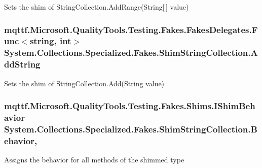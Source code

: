Sets the shim of String\-Collection.\-Add\-Range(\-String\mbox{[}$\,$\mbox{]} value)

\hypertarget{class_system_1_1_collections_1_1_specialized_1_1_fakes_1_1_shim_string_collection_ad96d351cb71a49a83fb719f2323b7cc3}{
\subsubsection[{Add\-String}]{\setlength{\rightskip}{0pt plus 5cm}mqttf.\-Microsoft.\-Quality\-Tools.\-Testing.\-Fakes.\-Fakes\-Delegates.\-Func$<$string, int$>$ System.\-Collections.\-Specialized.\-Fakes.\-Shim\-String\-Collection.\-Add\-String\hspace{0.3cm}{\ttfamily [set]}}}\label{class_system_1_1_collections_1_1_specialized_1_1_fakes_1_1_shim_string_collection_ad96d351cb71a49a83fb719f2323b7cc3}


Sets the shim of String\-Collection.\-Add(\-String value)

\hypertarget{class_system_1_1_collections_1_1_specialized_1_1_fakes_1_1_shim_string_collection_a4e79435f39bae5e9add02a591125acab}{
\subsubsection[{Behavior}]{\setlength{\rightskip}{0pt plus 5cm}mqttf.\-Microsoft.\-Quality\-Tools.\-Testing.\-Fakes.\-Shims.\-I\-Shim\-Behavior System.\-Collections.\-Specialized.\-Fakes.\-Shim\-String\-Collection.\-Behavior\hspace{0.3cm}{\ttfamily [static]}, {\ttfamily [set]}}}\label{class_system_1_1_collections_1_1_specialized_1_1_fakes_1_1_shim_string_collection_a4e79435f39bae5e9add02a591125acab}


Assigns the behavior for all methods of the shimmed type


